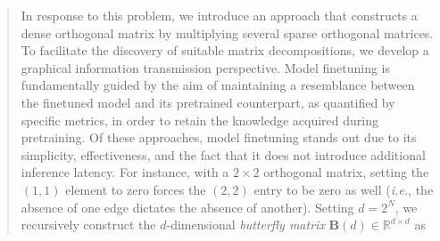 \begin{abstract}
\begin{itemize}[leftmargin=*,nosep]
In response to this problem, we introduce an approach that constructs a dense orthogonal matrix by multiplying several sparse orthogonal matrices. To facilitate the discovery of suitable matrix decompositions, we develop a graphical information transmission perspective. Model finetuning is fundamentally guided by the aim of maintaining a resemblance between the finetuned model and its pretrained counterpart, as quantified by specific metrics, in order to retain the knowledge acquired during pretraining. Of these approaches, model finetuning stands out due to its simplicity, effectiveness, and the fact that it does not introduce additional inference latency. For instance, with a $2 \times 2$ orthogonal matrix, setting the $(1,1)$ element to zero forces the $(2,2)$ entry to be zero as well (\emph{i.e.}, the absence of one edge dictates the absence of another). Setting $d=2^N$, we recursively construct the $d$-dimensional \emph{butterfly matrix} $\bm{B}(d)\in\mathbb{R}^{d\times d}$ as


\end{itemize}
\end{abstract}
